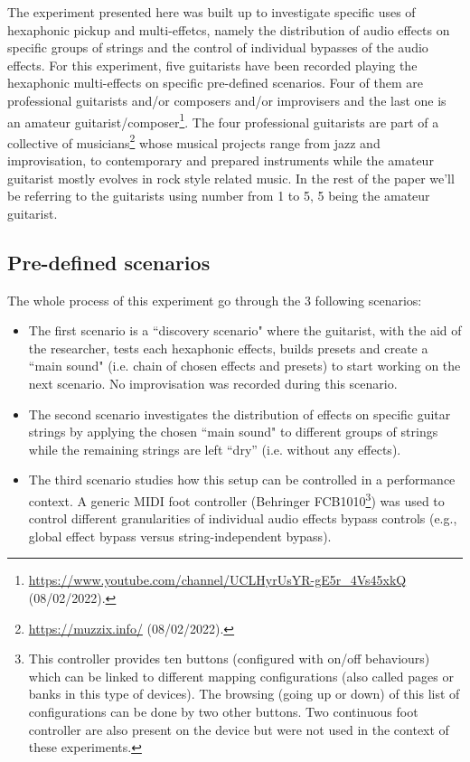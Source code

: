 \documentclass{article}
\begin{document}
The experiment presented here was built up to investigate specific uses of hexaphonic pickup and multi-effetcs, name\-ly the distribution of audio effects on specific groups of strings and the control of individual bypasses of the audio effects. 
For this experiment, five guitarists have been recorded playing the hexaphonic multi-effects on specific pre-defined scenarios. Four of them are professional guitarists and/or composers and/or improvisers and the last one is an amateur guitarist/composer\footnote{\url{https://www.youtube.com/channel/UCLHyrUsYR-gE5r\_4Vs45xkQ} (08/02/2022).}. The four professional guitarists are part of a collective of musicians\footnote{\url{https://muzzix.info/} (08/02/2022).} whose musical pro\-jects range from jazz and improvisation, to contemporary and prepared instruments while the amateur guitarist mostly evolves in rock style related music. In the rest of the paper we'll be referring to the guitarists using number from 1 to 5, 5 being the amateur guitarist. 


\subsection{Pre-defined scenarios}
The whole process of this experiment go through the 3 following scenarios:
\begin{itemize}
    \item The first scenario is a ``discovery scenario" where the guitarist, with the aid of the researcher, tests each hexaphonic effects, builds presets and create a ``main sound" (i.e. chain of chosen effects and presets) to start working on the next scenario. No improvisation was recorded during this scenario.  
    
    \item The second scenario investigates the distribution of effects on specific guitar strings by applying the chosen ``main sound" to different groups of strings while the remaining strings are left ``dry'' (i.e. without any effects).
    
    \item The third scenario studies how this setup can be controlled in a performance context. A generic MIDI foot controller (Behringer FCB1010\footnote{\label{foot:Behringer1010}This controller provides ten buttons (configured with on/off behaviours) which can be linked to different mapping configurations (also called pages or banks in this type of devices). The browsing (going up or down) of this list of configurations can be done by two other buttons. Two continuous foot controller are also present on the device but were not used in the context of these experiments.}) was used to control different granularities of individual audio effects bypass controls (e.g., global effect bypass versus string-independent bypass). 
\end{itemize} 
\end{document}
